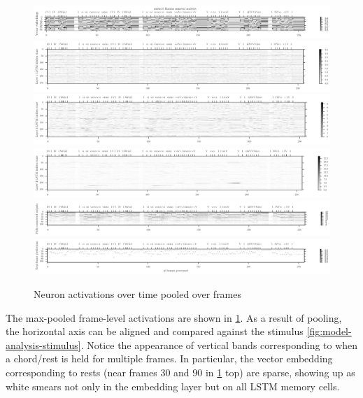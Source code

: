 \begin{figure}[tb]
    \centering
    \includegraphics[width=1.0\linewidth]{model-analysis-chords-0.pdf}
    \includegraphics[width=1.0\linewidth]{model-analysis-chords-1.pdf}
    \includegraphics[width=1.0\linewidth]{model-analysis-chords-2.pdf}
    \includegraphics[width=1.0\linewidth]{model-analysis-chords-3.pdf}
    \includegraphics[width=1.0\linewidth]{model-analysis-chords-4.pdf}
    \includegraphics[width=1.0\linewidth]{model-analysis-chords-5.pdf}
    \caption{Neuron activations over time pooled over frames}
    \label{fig:model-analysis-frames}
\end{figure}

The max-pooled frame-level activations are shown in
\cref{fig:model-analysis-frames}. As a result of pooling, the horizontal axis
can be aligned and compared against the stimulus
\cref{fig:model-analysis-stimulus}. Notice the appearance of vertical bands
corresponding to when a chord/rest is held for multiple frames. In particular,
the vector embedding corresponding to rests (\eg near frames $30$ and $90$ in
\cref{fig:model-analysis-frames} top) are sparse, showing up as white smears
not only in the embedding layer but on all LSTM memory cells.

